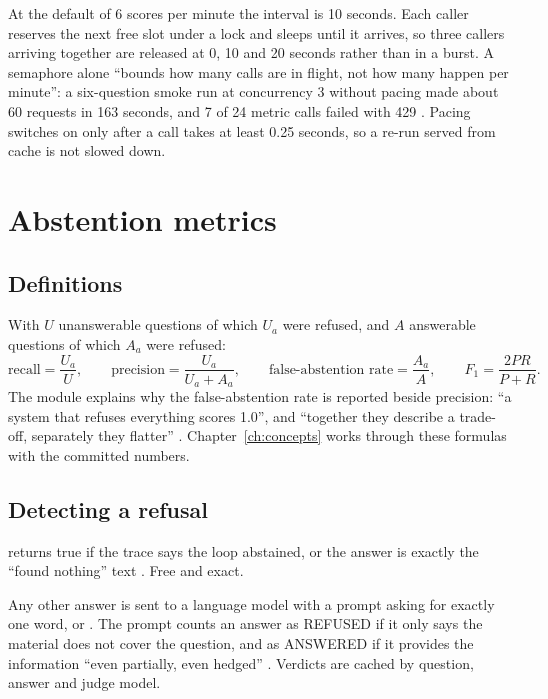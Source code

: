 At the default of 6 scores per minute the interval is 10 seconds. Each caller reserves the next free slot under a lock and sleeps until it arrives, so three callers arriving together are released at 0, 10 and 20 seconds rather than in a burst. A semaphore alone \enquote{bounds how many calls are in flight, not how many happen per minute}: a six-question smoke run at concurrency 3 without pacing made about 60 requests in 163 seconds, and 7 of 24 metric calls failed with 429 . Pacing switches on only after a call takes at least 0.25 seconds, so a re-run served from cache is not slowed down.

\section{Abstention metrics}
\label{sec:abstention-harness}

\subsection{Definitions}

With $U$ unanswerable questions of which $U_a$ were refused, and $A$ answerable questions of which $A_a$ were refused:
\begin{equation}
\text{recall} = \frac{U_a}{U}, \qquad \text{precision} = \frac{U_a}{U_a + A_a}, \qquad \text{false-abstention rate} = \frac{A_a}{A}, \qquad F_1 = \frac{2PR}{P+R}.
\end{equation}
The module explains why the false-abstention rate is reported beside precision: \enquote{a system that refuses everything scores 1.0}, and \enquote{together they describe a trade-off, separately they flatter} . Chapter~\ref{ch:concepts} works through these formulas with the committed  numbers.

\subsection{Detecting a refusal}

\begin{description}[style=nextline]
  \item[Structural.]  returns true if the trace says the loop abstained, or the answer is exactly the \enquote{found nothing} text . Free and exact.
  \item[Judged.] Any other answer is sent to a language model with a prompt asking for exactly one word,  or . The prompt counts an answer as REFUSED if it only says the material does not cover the question, and as ANSWERED if it provides the information \enquote{even partially, even hedged} . Verdicts are cached by question, answer and judge model.
\end{description}

